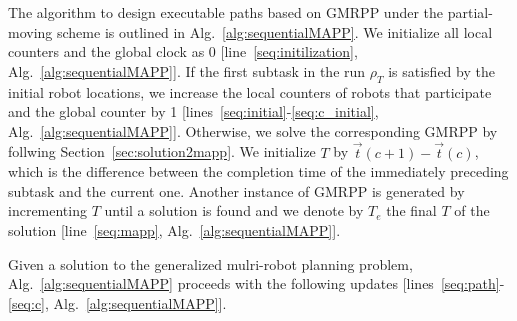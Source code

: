 \documentclass[Afour,sageh,times]{sagej}
\begin{document}
{{\begin{algorithm}[!t]
{{          
        }
      }
\end{algorithm}}

The algorithm to design  executable paths based on GMRPP under the  partial-moving scheme is outlined in Alg.~\ref{alg:sequentialMAPP}.  We initialize all local counters and the global clock as 0 [line~\ref{seq:initilization}, Alg.~\ref{alg:sequentialMAPP}].
If the first subtask in the run $\rho_T$ is satisfied by the initial  robot locations, we increase the local counters of robots that participate  and the global counter by 1 [lines~\ref{seq:initial}-\ref{seq:c_initial}, Alg.~\ref{alg:sequentialMAPP}]. Otherwise, we solve the corresponding GMRPP by follwing Section~\ref{sec:solution2mapp}.  We initialize $T$ by $\vec{t}(c+1) - \vec{t}(c)$,  which is the difference between the completion time of the immediately preceding subtask and the current one. Another instance of GMRPP is generated by incrementing $T$ until a solution is found and we denote by $T_e$  the final $T$ of the solution [line~\ref{seq:mapp}, Alg.~\ref{alg:sequentialMAPP}]. {Given a solution to the generalized mulri-robot planning problem, Alg.~\ref{alg:sequentialMAPP} proceeds with the following updates [lines~\ref{seq:path}-\ref{seq:c}, Alg.~\ref{alg:sequentialMAPP}].



}}
\end{document}
